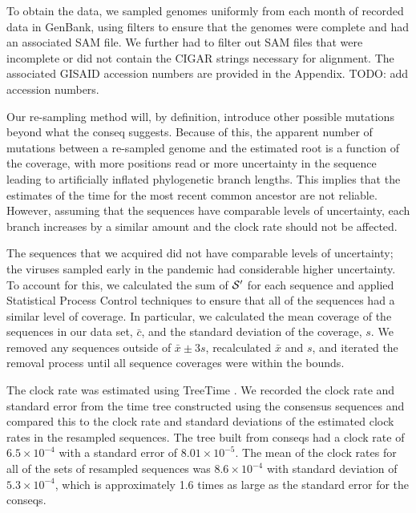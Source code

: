\documentclass[10pt]{article}
\begin{document}
To obtain the data, we sampled genomes uniformly from each month of recorded data in GenBank, using filters to ensure that the genomes were complete and had an associated SAM file.
We further had to filter out SAM files that were incomplete or did not contain the CIGAR strings necessary for alignment.
The associated GISAID accession numbers are provided in the Appendix. TODO: add accession numbers.  

Our re-sampling method will, by definition, introduce other possible mutations beyond what the conseq suggests.
Because of this, the apparent number of mutations between a re-sampled genome and the estimated root is a function of the coverage, with more positions read or more uncertainty in the sequence leading to artificially inflated phylogenetic branch lengths.
This implies that the estimates of the time for the most recent common ancestor are not reliable.
However, assuming that the sequences have comparable levels of uncertainty, each branch increases by a similar amount and the clock rate should not be affected. 

The sequences that we acquired did not have comparable levels of uncertainty; the viruses sampled early in the pandemic had considerable higher uncertainty.
To account for this, we calculated the sum of $\mathcal{S}'$ for each sequence and applied Statistical Process Control techniques to ensure that all of the sequences had a similar level of coverage.
In particular, we calculated the mean coverage of the sequences in our data set, $\bar c$, and the standard deviation of the coverage, $s$. 
We removed any sequences outside of $\bar x \pm 3 s$, recalculated $\bar x$ and $s$, and iterated the removal process until all sequence coverages were within the bounds.


The clock rate was estimated using TreeTime \citep{sagulenkoTreeTimeMaximumlikelihoodPhylodynamic2018}. 
We recorded the clock rate and standard error from the time tree constructed using the consensus sequences and compared this to the clock rate and standard deviations of the estimated clock rates in the resampled sequences. The tree built from conseqs had a clock rate of $6.5\times 10^{-4}$ with a standard error of $8.01\times 10^{-5}$. The mean of the clock rates for all of the sets of resampled sequences was $8.6\times 10^{-4}$ with standard deviation of $5.3\times 10^{-4}$, which is approximately 1.6 times as large as the standard error for the conseqs.
\end{document}
